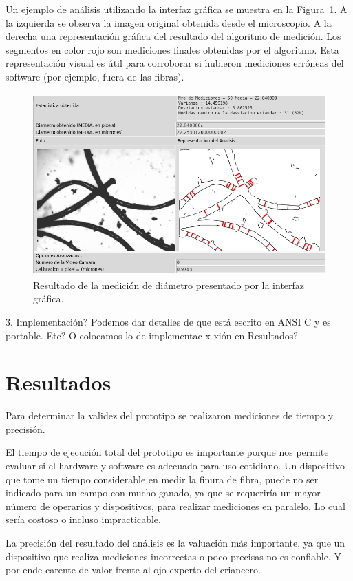 \documentclass[runningheads,a4paper]{llncs}
\begin{document}
Un ejemplo de análisis utilizando la interfaz gráfica se muestra en la Figura~\ref{fig:captura2}.
A la izquierda se observa la imagen original obtenida desde el microscopio. A la derecha una representación gráfica del resultado del algoritmo de medición. Los segmentos en color rojo son mediciones finales obtenidas por el algoritmo. Esta representación visual es útil para corroborar si hubieron mediciones erróneas del software (por ejemplo, fuera de las fibras).
\begin{figure}
\centering
\includegraphics[height=7cm]{captura2}
\caption{Resultado de la medición de diámetro presentado por la interfaz gráfica.}
\label{fig:captura2}
\end{figure}



3. Implementación?
Podemos dar detalles de que está escrito en ANSI C y es portable. Etc? O colocamos lo de implementac               x xión en Resultados?

\section{Resultados}

Para determinar la validez del prototipo se realizaron mediciones de tiempo y precisión.

El tiempo de ejecución total del prototipo es importante porque nos permite evaluar si el hardware y software es adecuado para uso cotidiano. Un dispositivo que tome un tiempo considerable en medir la finura de fibra, puede no ser indicado para un campo con mucho ganado, ya que se requeriría un mayor número de operarios y dispositivos, para realizar mediciones en paralelo. Lo cual sería costoso o incluso impracticable.

La precisión del resultado del análisis es la valuación más importante, ya que un dispositivo que realiza mediciones incorrectas o poco precisas no es confiable. Y por ende carente de valor frente al ojo experto del criancero. 
\end{document}
